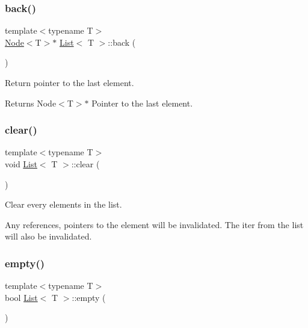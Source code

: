 \subsubsection{\texorpdfstring{back()}{back()}}
{\footnotesize\ttfamily template$<$typename T$>$ \\
\hyperlink{struct_node}{Node}$<$T$>$$\ast$ \hyperlink{class_list}{List}$<$ T $>$\+::back (\begin{DoxyParamCaption}{ }\end{DoxyParamCaption})\hspace{0.3cm}{\ttfamily [inline]}}



Return pointer to the last element. 

\begin{DoxyReturn}{Returns}
Node$<$\+T$>$$\ast$ Pointer to the last element. 
\end{DoxyReturn}
\mbox{\label{class_list_ae296516a252e11963dbf963727ce429a}} 
\subsubsection{\texorpdfstring{clear()}{clear()}}
{\footnotesize\ttfamily template$<$typename T$>$ \\
void \hyperlink{class_list}{List}$<$ T $>$\+::clear (\begin{DoxyParamCaption}{ }\end{DoxyParamCaption})\hspace{0.3cm}{\ttfamily [inline]}}



Clear every elements in the list. 

Any references, pointers to the element will be invalidated. The {\ttfamily iter} from the list will also be invalidated. \mbox{\label{class_list_a3737ca60365287ce663393d8c07d1a41}} 
\subsubsection{\texorpdfstring{empty()}{empty()}}
{\footnotesize\ttfamily template$<$typename T$>$ \\
bool \hyperlink{class_list}{List}$<$ T $>$\+::empty (\begin{DoxyParamCaption}{ }\end{DoxyParamCaption})\hspace{0.3cm}{\ttfamily [inline]}}



